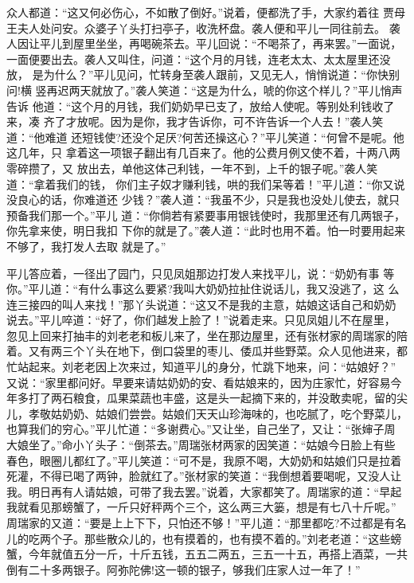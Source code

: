 众人都道：“这又何必伤心，不如散了倒好。”说着，便都洗了手，大家约着往
贾母王夫人处问安。众婆子丫头打扫亭子，收洗杯盘。袭人便和平儿一同往前去。
袭人因让平儿到屋里坐坐，再喝碗茶去。平儿回说：“不喝茶了，再来罢。”一面说，
一面便要出去。袭人又叫住，问道：“这个月的月钱，连老太太、太太屋里还没放，
是为什么？”平儿见问，忙转身至袭人跟前，又见无人，悄悄说道：“你快别问!横
竖再迟两天就放了。”袭人笑道：“这是为什么，唬的你这个样儿？”平儿悄声告诉
他道：“这个月的月钱，我们奶奶早已支了，放给人使呢。等别处利钱收了来，凑
齐了才放呢。因为是你，我才告诉你，可不许告诉一个人去！”袭人笑道：“他难道
还短钱使?还没个足厌?何苦还操这心？”平儿笑道：“何曾不是呢。他这几年，只
拿着这一项银子翻出有几百来了。他的公费月例又使不着，十两八两零碎攒了，又
放出去，单他这体己利钱，一年不到，上千的银子呢。”袭人笑道：“拿着我们的钱，
你们主子奴才赚利钱，哄的我们呆等着！”平儿道：“你又说没良心的话，你难道还
少钱？”袭人道：“我虽不少，只是我也没处儿使去，就只预备我们那一个。”平儿
道：“你倘若有紧要事用银钱使时，我那里还有几两银子，你先拿来使，明日我扣
下你的就是了。”袭人道：“此时也用不着。怕一时要用起来不够了，我打发人去取
就是了。”

平儿答应着，一径出了园门，只见凤姐那边打发人来找平儿，说：“奶奶有事
等你。”平儿道：“有什么事这么要紧?我叫大奶奶拉扯住说话儿，我又没逃了，这
么连三接四的叫人来找！”那丫头说道：“这又不是我的主意，姑娘这话自己和奶奶
说去。”平儿啐道：“好了，你们越发上脸了！”说着走来。只见凤姐儿不在屋里，
忽见上回来打抽丰的刘老老和板儿来了，坐在那边屋里，还有张材家的周瑞家的陪
着。又有两三个丫头在地下，倒口袋里的枣儿、倭瓜并些野菜。众人见他进来，都
忙站起来。刘老老因上次来过，知道平儿的身分，忙跳下地来，问：“姑娘好？”
又说：“家里都问好。早要来请姑奶奶的安、看姑娘来的，因为庄家忙，好容易今
年多打了两石粮食，瓜果菜蔬也丰盛，这是头一起摘下来的，并没敢卖呢，留的尖
儿，孝敬姑奶奶、姑娘们尝尝。姑娘们天天山珍海味的，也吃腻了，吃个野菜儿，
也算我们的穷心。”平儿忙道：“多谢费心。”又让坐，自己坐了，又让：“张婶子周
大娘坐了。”命小丫头子：“倒茶去。”周瑞张材两家的因笑道：“姑娘今日脸上有些
春色，眼圈儿都红了。”平儿笑道：“可不是，我原不喝，大奶奶和姑娘们只是拉着
死灌，不得已喝了两钟，脸就红了。”张材家的笑道：“我倒想着要喝呢，又没人让
我。明日再有人请姑娘，可带了我去罢。”说着，大家都笑了。周瑞家的道：“早起
我就看见那螃蟹了，一斤只好秤两个三个，这么两三大篓，想是有七八十斤呢。”
周瑞家的又道：“要是上上下下，只怕还不够！”平儿道：“那里都吃?不过都是有名
儿的吃两个子。那些散众儿的，也有摸着的，也有摸不着的。”刘老老道：“这些螃
蟹，今年就值五分一斤，十斤五钱，五五二两五，三五一十五，再搭上酒菜，一共
倒有二十多两银子。阿弥陀佛!这一顿的银子，够我们庄家人过一年了！”

